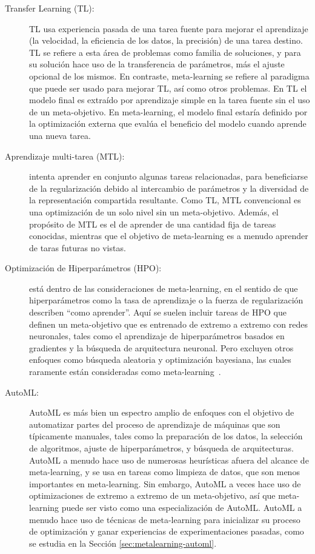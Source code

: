 \begin{description}
	\item[Transfer Learning (TL):] TL usa experiencia pasada de una tarea fuente para mejorar el aprendizaje (la velocidad, la eficiencia de los datos, la precisión) de una tarea destino. TL se refiere a esta área de problemas como familia de soluciones, y para su solución hace uso de la transferencia de parámetros, más el ajuste opcional de los mismos. En contraste, meta-learning se refiere al paradigma que puede ser usado para mejorar TL, así como otros problemas. En TL el modelo final es extraído por aprendizaje simple en la tarea fuente sin el uso de un meta-objetivo. En meta-learning, el modelo final estaría definido por la optimización externa que evalúa el beneficio del modelo cuando aprende una nueva tarea. %
	
	\item[Aprendizaje multi-tarea (MTL):] intenta aprender en conjunto algunas tareas relacionadas, para beneficiarse de la regularización debido al intercambio de parámetros y la diversidad de la representación compartida resultante. Como TL, MTL convencional es una optimización de un solo nivel sin un meta-objetivo. Además, el propósito de MTL es el de aprender de una cantidad fija de tareas conocidas, mientras que el objetivo de meta-learning es a menudo aprender de taras futuras no vistas.
	 
	\item[Optimización de Hiperparámetros (HPO):] está dentro de las consideraciones de meta-learning, en el sentido de que hiperparámetros como la tasa de aprendizaje o la fuerza de regularización describen ``como aprender''. Aquí se suelen incluir tareas de HPO que definen un meta-objetivo que es entrenado de extremo a extremo con redes neuronales, tales como el aprendizaje de hiperparámetros basados en gradientes y la búsqueda de arquitectura neuronal. Pero excluyen otros enfoques como búsqueda aleatoria y optimización bayesiana, las cuales raramente están consideradas como meta-learning~\cite{hospedales2021metalearning}.
	
	\item[AutoML:] AutoML es más bien un espectro amplio de enfoques con el objetivo de automatizar partes del proceso de aprendizaje de máquinas que son típicamente manuales, tales como la preparación de los datos, la selección de algoritmos, ajuste de hiperparámetros, y búsqueda de arquitecturas. AutoML a menudo hace uso de numerosas heurísticas afuera del alcance de meta-learning, y se usa en tareas como limpieza de datos, que son menos importantes en meta-learning. Sin embargo, AutoML a veces hace uso de optimizaciones de extremo a extremo de un meta-objetivo, así que meta-learning puede ser visto como una especialización de AutoML. AutoML a menudo hace uso de técnicas de meta-learning para inicializar su proceso de optimización y ganar experiencias de experimentaciones pasadas, como se estudia en la Sección \ref{sec:metalearning-automl}.
\end{description}

